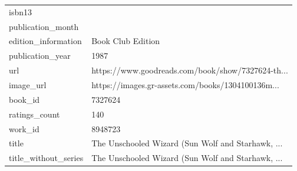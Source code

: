 \documentclass[10pt,final,journal,a4paper,oneside,twocolumn]{IEEEtran}
\begin{document}
\begin{table}
\begin{tabular}{ll}
        isbn13               &                                                    \\
        publication\_month    &                                                    \\
        edition\_information  &                                  Book Club Edition \\
        publication\_year     &                                               1987 \\
        url                  &  https://www.goodreads.com/book/show/7327624-th... \\
        image\_url            &  https://images.gr-assets.com/books/1304100136m... \\
        book\_id              &                                            7327624 \\
        ratings\_count        &                                                140 \\
        work\_id              &                                            8948723 \\
        title                &  The Unschooled Wizard (Sun Wolf and Starhawk, ... \\
        title\_without\_series &  The Unschooled Wizard (Sun Wolf and Starhawk, ... \\
        \bottomrule
        \end{tabular}
        
\end{table}
\end{document}
